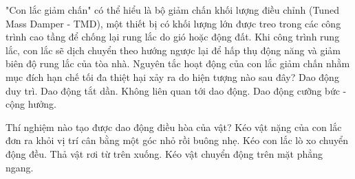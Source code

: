 \begin{ex}	"Con lắc giảm chấn" có thể hiểu là bộ giảm chấn khối lượng điều chỉnh (Tuned Mass Damper - TMD), một thiết bị có khối lượng lớn được treo trong các công trình cao tầng để chống lại rung lắc do gió hoặc động đất. Khi công trình rung lắc, con lắc sẽ dịch chuyển theo hướng ngược lại để hấp thụ động năng và giảm biên độ rung lắc của tòa nhà. Nguyên tắc hoạt động của con lắc giảm chấn nhằm mục đích hạn chế tối đa thiệt hại xảy ra do hiện tượng nào sau đây?
	\choice
	{Dao động duy trì.}
	{Dao động tắt dần.}
	{Không liên quan tới dao động.}
	{\True Dao động cưỡng bức - cộng hưởng.}
\end{ex}

\begin{ex}	Thí nghiệm nào tạo được dao động điều hòa của vật?
	\choice
	{\True Kéo vật nặng của con lắc đơn ra khỏi vị trí cân bằng một góc nhỏ rồi buông nhẹ.}
	{Kéo con lắc lò xo chuyển động đều.}
	{Thả vật rơi từ trên xuống.}
	{Kéo vật chuyển động trên mặt phẳng ngang.}
\end{ex}


